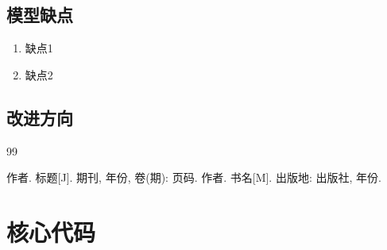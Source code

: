 \documentclass[12pt,a4paper]{ctexart}
\begin{document}
\subsection{模型缺点}
\begin{enumerate}
    \item 缺点1
    \item 缺点2
\end{enumerate}

\subsection{改进方向}

\begin{thebibliography}{99}

 作者. 标题[J]. 期刊, 年份, 卷(期): 页码.
 作者. 书名[M]. 出版地: 出版社, 年份.

\end{thebibliography}

\appendix
\section{核心代码}
\end{document}
